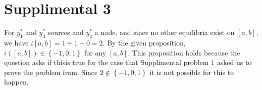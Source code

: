 \documentclass[11pt, letterpaper]{report}
\begin{document}
\section*{Supplimental 3}
For $y_1^*$ and $y_3^*$ sources and $y_2^*$ a node, and since no other equilibria exist on $[a,b]$, we have $i[a,b]=1+1+0=2$. By the given proposition, $i([a,b])\in \left\{ -1,0,1 \right\} $ for any $[a,b]$. This proposition holds because the question asks if thisis true for the case that Supplimental problem 1 asked us to prove the problem from. Since $2\notin \left\{ -1,0,1 \right\} $ it is not possible for this to happen.
\end{document}
